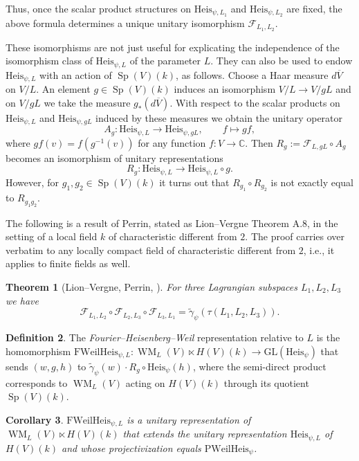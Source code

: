 \documentclass{article}
\def\mc#1{\mathcal{#1}}
\def\C{\mathbb{C}}
\def\ol#1{\overline{#1}}
\DeclareMathOperator{\Sp}{Sp}
\newtheorem{thm}{Theorem}[subsection]
\newtheorem{cor}[thm]{Corollary}
\theoremstyle{definition}
\newtheorem{dfn}[thm]{Definition}
\numberwithin{equation}{subsection}
\renewcommand{\-}{\hyp{}}
\DeclareMathOperator{\WM}{WM}
\begin{document}
\begin{appendices}
Thus, once the scalar product structures on $\mathrm{Heis}_{\psi,L_1}$ and $\mathrm{Heis}_{\psi,L_2}$ are fixed, the above formula determines a unique unitary isomorphism $\mc{F}_{L_1, L_2}$.

These isomorphisms are not just useful for explicating the independence of the isomorphism class of $\mathrm{Heis}_{\psi,L}$ of the parameter $L$. They can also be used to endow $\mathrm{Heis}_{\psi,L}$ with an action of $\Sp(V)(k)$, as follows. Choose a Haar measure $d \ol{V}$ on $V/L$. An element $g \in \Sp(V)(k)$ induces an isomorphism $V/L \to V/gL$ and on $V/gL$ we take the measure $g_*(d\ol{V})$. With respect to the scalar products on $\mathrm{Heis}_{\psi,L}$ and $\mathrm{Heis}_{\psi,gL}$ induced by these measures we obtain the unitary operator 
\[ A_g : \mathrm{Heis}_{\psi,L} \to \mathrm{Heis}_{\psi,gL},\qquad f \mapsto gf, \]
where $gf(v)=f(g^{-1}(v))$ for any function $f : V \to \C$. Then $R_g:=\mc{F}_{L,gL}\circ A_g$ becomes an isomorphism of unitary representations
\[ R_g : \mathrm{Heis}_{\psi,L} \to \mathrm{Heis}_{\psi,L}\circ g. \]
However, for $g_1,g_2 \in \Sp(V)(k)$ it turns out that $R_{g_1}\circ R_{g_2}$ is not exactly equal to $R_{g_1g_2}$.


The following is a result of Perrin, stated as Lion--Vergne Theorem A.8, in the setting of a local field $k$ of characteristic different from $2$. The proof carries over verbatim to any locally compact field of characteristic different from $2$, i.e., it applies to finite fields as well.

\begin{thm}[{Lion--Vergne, Perrin, \cite[A.8]{LionVergne}}]
	For three Lagrangian subspaces $L_1,L_2,L_3$ we have
		\[ \mc{F}_{L_1, L_2} \circ \mc{F}_{L_2,L_3} \circ \mc{F}_{L_3,L_1} = \tilde\gamma_\psi(\tau(L_1,L_2,L_3)). \]
\end{thm}


\begin{dfn}	
		 The \emph{Fourier--Heisenberg--Weil} representation relative to $L$ is the homomorphism $\mathrm{FWeilHeis}_{\psi,L} : \WM_{L}(V) \ltimes H(V)(k) \to \mathrm{GL}(\mathrm{Heis}_\psi)$ that sends $(w,g, h)$ to $\tilde\gamma_\psi(w) \cdot  R_g \circ \mathrm{Heis}_\psi(h) $, where the semi-direct product corresponds to $\WM_{L}(V)$ acting on $H(V)(k)$ through its quotient $\Sp(V)(k)$.
\end{dfn}

\begin{cor} 
	$\mathrm{FWeilHeis}_{\psi,L}$ is a unitary representation of $\WM_{L}(V) \ltimes H(V)(k)$ that extends the unitary representation $\mathrm{Heis}_{\psi,L}$ of $H(V)(k)$ and whose projectivization equals $\mathrm{PWeilHeis}_\psi$.
\end{cor}


\end{appendices}
\end{document}
